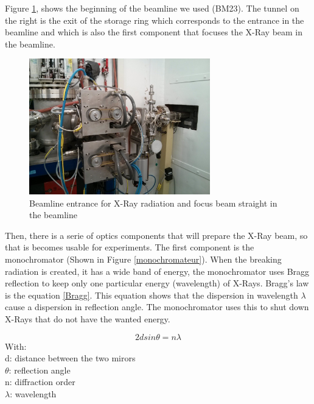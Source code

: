 \documentclass[11pt,a4paper,oneside]{report}
\begin{document}
Figure \ref{Incident}, shows the beginning of the beamline we used (BM23). The tunnel on the right is the exit of the  storage ring which corresponds to the entrance in the beamline and which is also the first component that focuses the X-Ray beam in the beamline.

\begin{figure}[H]
    \begin{center}
        \includegraphics[width=0.7\textwidth]{Images/IMG_20151210_202655.jpg}
        \caption{Beamline entrance for X-Ray radiation and focus beam straight in the beamline}
        \label{Incident}
    \end{center}
\end{figure}


Then, there is a serie of optics components that will prepare the X-Ray beam, so that is becomes usable for experiments. The first component is the monochromator (Shown in Figure \ref{monochromateur}). When the breaking radiation is created, it has a wide band of energy, the monochromator uses Bragg reflection to keep only one particular energy (wavelength) of X-Rays. Bragg's law is the equation \ref{Bragg}. This equation shows that the dispersion in wavelength $\lambda$ cause a dispersion in reflection angle. The monochromator uses this to shut down X-Rays that do not have the wanted energy.

\begin{equation}
    2d sin \theta = n \lambda  \label{Bragg}
\end{equation}
With:\\
d: distance between the two mirors\\
$\theta$: reflection angle\\
n: diffraction order\\
$\lambda$: wavelength\\
\end{document}
